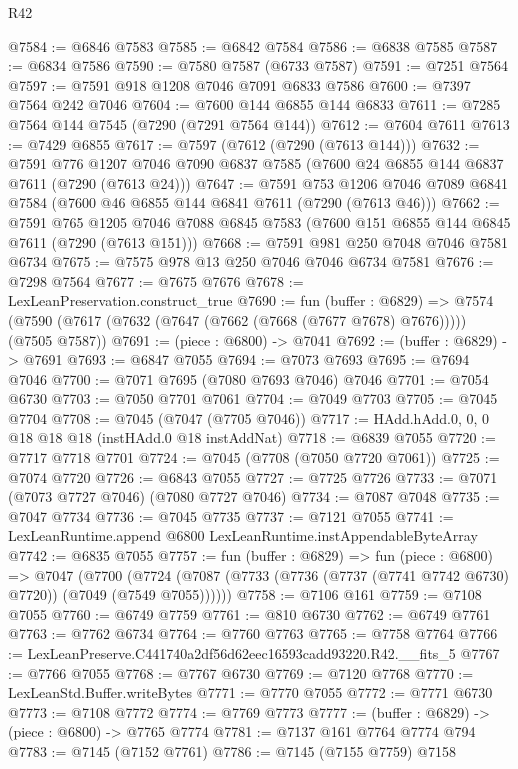\begin{lexlean}{R42}
\begin{coremodule}
{@7584 := @6846 @7583
@7585 := @6842 @7584
@7586 := @6838 @7585
@7587 := @6834 @7586
@7590 := @7580 @7587 (@6733 @7587)
@7591 := @7251 @7564
@7597 := @7591 @918 @1208 @7046 @7091 @6833 @7586
@7600 := @7397 @7564 @242 @7046
@7604 := @7600 @144 @6855 @144 @6833
@7611 := @7285 @7564 @144 @7545 (@7290 (@7291 @7564 @144))
@7612 := @7604 @7611
@7613 := @7429 @6855
@7617 := @7597 (@7612 (@7290 (@7613 @144)))
@7632 := @7591
    @776
    @1207
    @7046
    @7090
    @6837
    @7585
    (@7600 @24 @6855 @144 @6837 @7611 (@7290 (@7613 @24)))
@7647 := @7591
    @753
    @1206
    @7046
    @7089
    @6841
    @7584
    (@7600 @46 @6855 @144 @6841 @7611 (@7290 (@7613 @46)))
@7662 := @7591
    @765
    @1205
    @7046
    @7088
    @6845
    @7583
    (@7600 @151 @6855 @144 @6845 @7611 (@7290 (@7613 @151)))
@7668 := @7591 @981 @250 @7048 @7046 @7581 @6734
@7675 := @7575 @978 @13 @250 @7046 @7046 @6734 @7581
@7676 := @7298 @7564
@7677 := @7675 @7676
@7678 := LexLeanPreservation.construct_true
@7690 := fun (buffer : @6829) =>
  @7574 (@7590 (@7617 (@7632 (@7647 (@7662 (@7668 (@7677 @7678) @7676))))) (@7505 @7587))
@7691 := (piece : @6800) -> @7041
@7692 := (buffer : @6829) -> @7691
@7693 := @6847 @7055
@7694 := @7073 @7693
@7695 := @7694 @7046
@7700 := @7071 @7695 (@7080 @7693 @7046) @7046
@7701 := @7054 @6730
@7703 := @7050 @7701 @7061
@7704 := @7049 @7703
@7705 := @7045 @7704
@7708 := @7045 (@7047 (@7705 @7046))
@7717 := HAdd.hAdd.{0, 0, 0} @18 @18 @18 (instHAdd.{0} @18 instAddNat)
@7718 := @6839 @7055
@7720 := @7717 @7718 @7701
@7724 := @7045 (@7708 (@7050 @7720 @7061))
@7725 := @7074 @7720
@7726 := @6843 @7055
@7727 := @7725 @7726
@7733 := @7071 (@7073 @7727 @7046) (@7080 @7727 @7046)
@7734 := @7087 @7048
@7735 := @7047 @7734
@7736 := @7045 @7735
@7737 := @7121 @7055
@7741 := LexLeanRuntime.append @6800 LexLeanRuntime.instAppendableByteArray
@7742 := @6835 @7055
@7757 := fun (buffer : @6829) =>
  fun (piece : @6800) =>
  @7047
    (@7700 (@7724 (@7087 (@7733 (@7736 (@7737 (@7741 @7742 @6730) @7720)) (@7049 (@7549 @7055))))))
@7758 := @7106 @161
@7759 := @7108 @7055
@7760 := @6749 @7759
@7761 := @810 @6730
@7762 := @6749 @7761
@7763 := @7762 @6734
@7764 := @7760 @7763
@7765 := @7758 @7764
@7766 := LexLeanPreserve.C441740a2df56d62eec16593cadd93220.R42.__fits_5
@7767 := @7766 @7055
@7768 := @7767 @6730
@7769 := @7120 @7768
@7770 := LexLeanStd.Buffer.writeBytes
@7771 := @7770 @7055
@7772 := @7771 @6730
@7773 := @7108 @7772
@7774 := @7769 @7773
@7777 := (buffer : @6829) -> (piece : @6800) -> @7765 @7774
@7781 := @7137 @161 @7764 @7774 @794
@7783 := @7145 (@7152 @7761)
@7786 := @7145 (@7155 @7759) @7158
}
\end{coremodule}
\end{lexlean}
